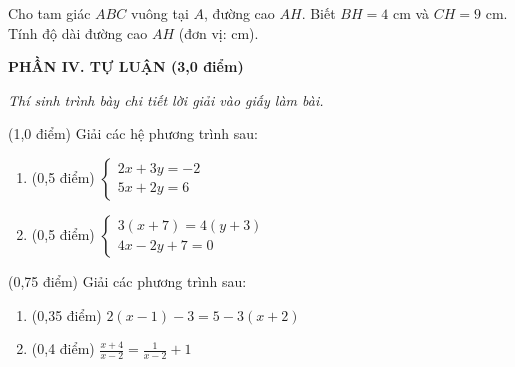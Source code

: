 \documentclass[12pt,a4paper]{article}
\begin{document}
\begin{ex}
Cho tam giác $ABC$ vuông tại $A$, đường cao $AH$. Biết $BH = 4\text{ cm}$ và $CH = 9\text{ cm}$. Tính độ dài đường cao $AH$ (đơn vị: cm). 
\end{ex}


\setcounter{ex}{0}
\noindent\textbf{\large PHẦN IV. TỰ LUẬN (3,0 điểm)}

\textit{Thí sinh trình bày chi tiết lời giải vào giấy làm bài.}

\vspace{1mm}
\begin{ex} (1,0 điểm)
Giải các hệ phương trình sau:
\begin{enumerate}[label=\textbf{\alph*)}, leftmargin=0.8cm, itemsep=2pt]
\item (0,5 điểm) $\begin{cases} 2x + 3y = -2 \\ 5x + 2y = 6 \end{cases}$
\item (0,5 điểm) $\begin{cases} 3(x + 7) = 4(y + 3) \\ 4x - 2y + 7 = 0 \end{cases}$
\end{enumerate}
\end{ex}
\vspace{0.5mm}

\begin{ex} (0,75 điểm)
Giải các phương trình sau:
\begin{enumerate}[label=\textbf{\alph*)}, leftmargin=0.8cm, itemsep=2pt]
\item (0,35 điểm) $2(x - 1) - 3 = 5 - 3(x + 2)$
\item (0,4 điểm) $\frac{x + 4}{x - 2} = \frac{1}{x - 2} + 1$
\end{enumerate}
\end{ex}
\vspace{0.5mm}
\end{document}
